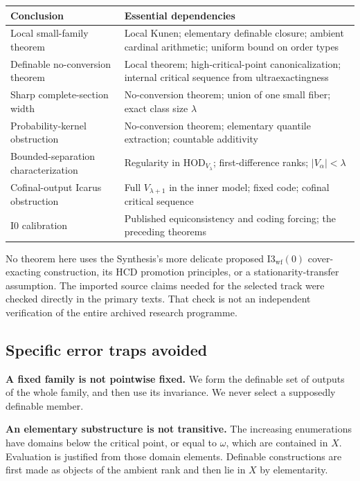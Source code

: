 \documentclass[11pt,letterpaper]{article}
\theoremstyle{definition}
\numberwithin{equation}{section}
\newcommand{\HOD}{\mathrm{HOD}}
\newcommand{\HCD}{\mathrm{HCD}}
\newcommand{\Izero}{\mathrm{I0}}
\begin{document}
\begin{center}
\small
\renewcommand{\arraystretch}{1.19}
\begin{tabularx}{\textwidth}{@{}P{.31\textwidth}Y@{}}
\toprule
\textbf{Conclusion}&\textbf{Essential dependencies}\\\midrule
Local small-family theorem&Local Kunen; elementary definable closure; ambient cardinal arithmetic; uniform bound on order types\\
Definable no-conversion theorem&Local theorem; high-critical-point canonicalization; internal critical sequence from ultraexactingness\\
Sharp complete-section width&No-conversion theorem; union of one small fiber; exact class size $\lambda$\\
Probability-kernel obstruction&No-conversion theorem; elementary quantile extraction; countable additivity\\
Bounded-separation characterization&Regularity in $\HOD_{V_\lambda}$; first-difference ranks; $|V_\alpha|<\lambda$\\
Cofinal-output Icarus obstruction&Full $V_{\lambda+1}$ in the inner model; fixed code; cofinal critical sequence\\
$\Izero$ calibration&Published equiconsistency and coding forcing; the preceding theorems\\
\bottomrule
\end{tabularx}
\end{center}

No theorem here uses the Synthesis's more delicate proposed $\mathrm{I3}_{\mathrm{wf}}(0)$ cover-exacting construction, its $\HCD$ promotion principles, or a stationarity-transfer assumption. The imported source claims needed for the selected track were checked directly in the primary texts. That check is not an independent verification of the entire archived research programme.

\subsection{Specific error traps avoided}

\textbf{A fixed family is not pointwise fixed.} We form the definable set of outputs of the whole family, and then use its invariance. We never select a supposedly definable member.

\textbf{An elementary substructure is not transitive.} The increasing enumerations have domains below the critical point, or equal to $\omega$, which are contained in $X$. Evaluation is justified from those domain elements. Definable constructions are first made as objects of the ambient rank and then lie in $X$ by elementarity.
\end{document}
